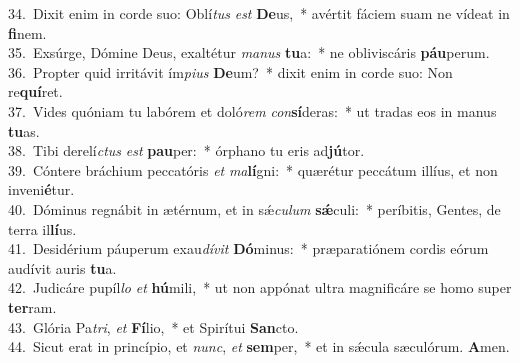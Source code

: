 {34.~}Dixit enim in corde suo: Oblí\textit{tus} \textit{est} \textbf{De}us,~* avértit fáciem suam ne vídeat in \textbf{fi}nem.\\
{35.~}Exsúrge, Dómine Deus, exaltétur \textit{ma}\textit{nus} \textbf{tu}a:~* ne obliviscáris \textbf{páu}perum.\\
{36.~}Propter quid irritávit ím\textit{pi}\textit{us} \textbf{De}um?~* dixit enim in corde suo: Non re\textbf{quí}ret.\\
{37.~}Vides quóniam tu labórem et doló\textit{rem} \textit{con}\textbf{sí}deras:~* ut tradas eos in manus \textbf{tu}as.\\
{38.~}Tibi derelí\textit{ctus} \textit{est} \textbf{pau}per:~* órphano tu eris ad\textbf{jú}tor.\\
{39.~}Cóntere bráchium peccatóris \textit{et} \textit{ma}\textbf{lí}gni:~* quærétur peccátum illíus, et non inveni\textbf{é}tur.\\
{40.~}Dóminus regnábit in ætérnum, et in sǽ\textit{cu}\textit{lum} \textbf{sǽ}culi:~* períbitis, Gentes, de terra il\textbf{lí}us.\\
{41.~}Desidérium páuperum exau\textit{dí}\textit{vit} \textbf{Dó}minus:~* præparatiónem cordis eórum audívit auris \textbf{tu}a.\\
{42.~}Judicáre pupíl\textit{lo} \textit{et} \textbf{hú}mili,~* ut non appónat ultra magnificáre se homo super \textbf{ter}ram.\\
{43.~}Glória Pa\textit{tri}, \textit{et} \textbf{Fí}lio,~* et Spirítui \textbf{San}cto.\\
{44.~}Sicut erat in princípio, et \textit{nunc}, \textit{et} \textbf{sem}per,~* et in sǽcula sæculórum. \textbf{A}men.\\
